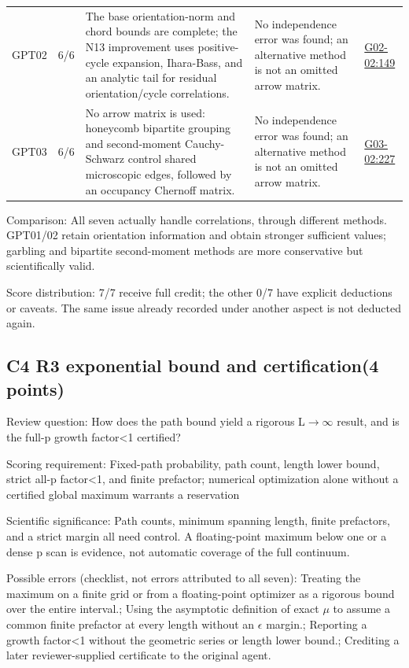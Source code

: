 \documentclass[11pt,a4paper]{article}
\begin{document}
{\begin{longtable}
{}GPT02 & 6/\allowbreak{}6 & The base orientation-norm and chord bounds are complete; the N13 improvement uses positive-cycle expansion,\allowbreak{} Ihara-Bass,\allowbreak{} and an analytic tail for residual orientation/\allowbreak{}cycle correlations. & No independence error was found; an alternative method is not an omitted arrow matrix. & \hyperref[src:G02-02]{G02-02:149}\tabularnewline
{}GPT03 & 6/\allowbreak{}6 & No arrow matrix is used: honeycomb bipartite grouping and second-moment Cauchy-Schwarz control shared microscopic edges,\allowbreak{} followed by an occupancy Chernoff matrix. & No independence error was found; an alternative method is not an omitted arrow matrix. & \hyperref[src:G03-02]{G03-02:227}\tabularnewline
\bottomrule
\end{longtable}
}
Comparison: All seven actually handle correlations,\allowbreak{} through different methods. GPT01/\allowbreak{}02 retain orientation information and obtain stronger sufficient values; garbling and bipartite second-moment methods are more conservative but scientifically valid.

Score distribution: 7/\allowbreak{}7 receive full credit; the other 0/\allowbreak{}7 have explicit deductions or caveats. The same issue already recorded under another aspect is not deducted again.

\clearpage
\subsection{C4 R3 exponential bound and certification(4 points)}
\label{aspect:C4}
Review question: How does the path bound yield a rigorous L\ensuremath{\rightarrow}\ensuremath{\infty} result,\allowbreak{} and is the full-p growth factor<1 certified?

Scoring requirement: Fixed-path probability,\allowbreak{} path count,\allowbreak{} length lower bound,\allowbreak{} strict all-p factor<1,\allowbreak{} and finite prefactor; numerical optimization alone without a certified global maximum warrants a reservation

Scientific significance: Path counts,\allowbreak{} minimum spanning length,\allowbreak{} finite prefactors,\allowbreak{} and a strict margin all need control. A floating-point maximum below one or a dense p scan is evidence,\allowbreak{} not automatic coverage of the full continuum.

Possible errors (checklist,\allowbreak{} not errors attributed to all seven): Treating the maximum on a finite grid or from a floating-point optimizer as a rigorous bound over the entire interval.; Using the asymptotic definition of exact \ensuremath{\mu} to assume a common finite prefactor at every length without an \ensuremath{\epsilon} margin.; Reporting a growth factor<1 without the geometric series or length lower bound.; Crediting a later reviewer-supplied certificate to the original agent.
\end{document}
